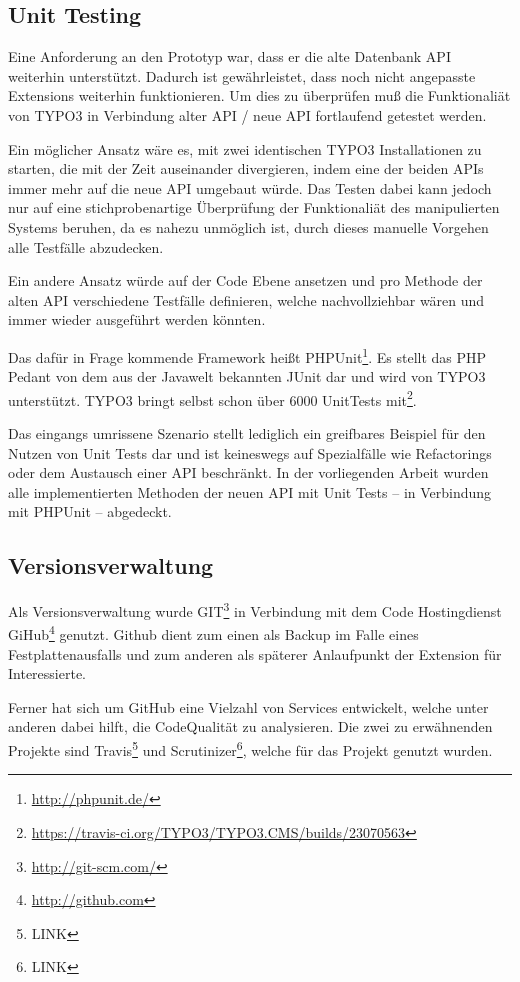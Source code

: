 \subsection{Unit Testing}
Eine Anforderung an den Prototyp war, dass er die alte Datenbank API weiterhin unterstützt. Dadurch ist gewährleistet, dass noch nicht angepasste Extensions weiterhin funktionieren. Um dies zu überprüfen muß die Funktionaliät von TYPO3 in Verbindung alter API / neue API fortlaufend getestet werden.

Ein möglicher Ansatz wäre es, mit zwei identischen TYPO3 Installationen zu starten, die mit der Zeit auseinander divergieren, indem eine der beiden APIs immer mehr auf die neue API umgebaut würde. Das Testen dabei kann jedoch nur auf eine stichprobenartige Überprüfung der Funktionaliät des manipulierten Systems beruhen, da es nahezu unmöglich ist, durch dieses manuelle Vorgehen alle Testfälle abzudecken.

Ein andere Ansatz würde auf der Code Ebene ansetzen und pro Methode der alten API verschiedene Testfälle definieren, welche nachvollziehbar wären und immer wieder ausgeführt werden könnten.

Das dafür in Frage kommende Framework heißt PHPUnit\footnote{\url{http://phpunit.de/}}. Es stellt das PHP Pedant von dem aus der Javawelt bekannten JUnit dar und wird von TYPO3 unterstützt. TYPO3 bringt selbst schon über 6000 UnitTests mit\footnote{\url{https://travis-ci.org/TYPO3/TYPO3.CMS/builds/23070563}}.

Das eingangs umrissene Szenario stellt lediglich ein greifbares Beispiel für den Nutzen von Unit Tests dar und ist keineswegs auf Spezialfälle wie Refactorings oder dem Austausch einer API beschränkt. In der vorliegenden Arbeit wurden alle implementierten Methoden der neuen API mit Unit Tests – in Verbindung mit PHPUnit – abgedeckt.

\subsection{Versionsverwaltung}
Als Versionsverwaltung wurde GIT\footnote{\url{http://git-scm.com/}} in Verbindung mit dem Code Hostingdienst GiHub\footnote{\url{http://github.com}} genutzt. Github dient zum einen als Backup im Falle eines Festplattenausfalls und zum anderen als späterer Anlaufpunkt der Extension für Interessierte.

Ferner hat sich um GitHub eine Vielzahl von Services entwickelt, welche unter anderen dabei hilft, die CodeQualität zu analysieren. Die zwei zu erwähnenden Projekte sind Travis\footnote{LINK} und Scrutinizer\footnote{LINK}, welche für das Projekt genutzt wurden.

